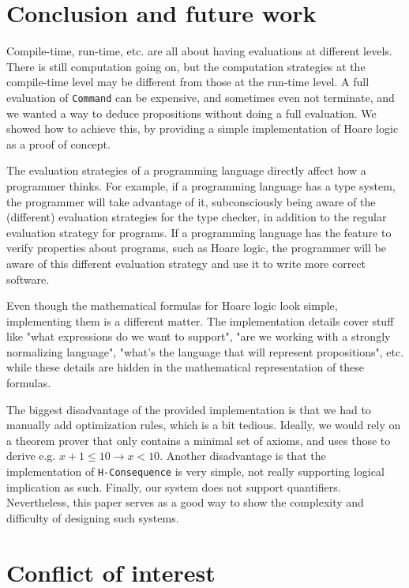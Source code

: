 \documentclass{article}
\begin{document}
\section{Conclusion and future work}

Compile-time, run-time, etc. are all about having evaluations at different levels. There is still computation going on, but the computation strategies at the compile-time level may be different from those at the run-time level. A full evaluation of \texttt{Command} can be expensive, and sometimes even not terminate, and we wanted a way to deduce propositions without doing a full evaluation. We showed how to achieve this, by providing a simple implementation of Hoare logic as a proof of concept.

The evaluation strategies of a programming language directly affect how a programmer thinks. For example, if a programming language has a type system, the programmer will take advantage of it, subconsciously being aware of the (different) evaluation strategies for the type checker, in addition to the regular evaluation strategy for programs. If a programming language has the feature to verify properties about programs, such as Hoare logic, the programmer will be aware of this different evaluation strategy and use it to write more correct software.

Even though the mathematical formulas for Hoare logic look simple, implementing them is a different matter. The implementation details cover stuff like "what expressions do we want to support", "are we working with a strongly normalizing language", "what's the language that will represent propositions", etc. while these details are hidden in the mathematical representation of these formulas.

The biggest disadvantage of the provided implementation is that we had to manually add optimization rules, which is a bit tedious. Ideally, we would rely on a theorem prover that only contains a minimal set of axioms, and uses those to derive e.g. $x + 1 \le 10 \to x < 10$. Another disadvantage is that the implementation of \texttt{H-Consequence} is very simple, not really supporting logical implication as such. Finally, our system does not support quantifiers. Nevertheless, this paper serves as a good way to show the complexity and difficulty of designing such systems.

\section{Conflict of interest}
\end{document}
